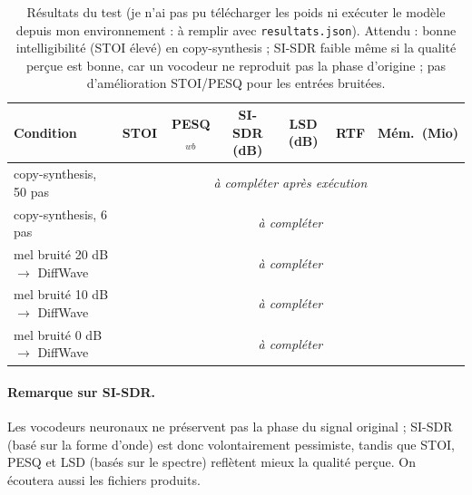 \begin{table}[H]\centering\small
\begin{tabular}{lcccccc}\toprule
Condition & STOI & PESQ$_{wb}$ & SI-SDR (dB) & LSD (dB) & RTF & Mém.\ (Mio)\\\midrule
copy-synthesis, 50 pas & \multicolumn{6}{c}{\emph{à compléter après exécution}}\\
copy-synthesis, 6 pas  & \multicolumn{6}{c}{\emph{à compléter}}\\
mel bruité 20 dB $\to$ DiffWave & \multicolumn{6}{c}{\emph{à compléter}}\\
mel bruité 10 dB $\to$ DiffWave & \multicolumn{6}{c}{\emph{à compléter}}\\
mel bruité 0 dB $\to$ DiffWave & \multicolumn{6}{c}{\emph{à compléter}}\\\bottomrule
\end{tabular}
\caption{Résultats du test (je n'ai pas pu télécharger les poids ni exécuter le modèle depuis mon environnement : à remplir avec \texttt{resultats.json}). Attendu : bonne intelligibilité (STOI élevé) en copy-synthesis ; SI-SDR faible même si la qualité perçue est bonne, car un vocodeur ne reproduit pas la phase d'origine ; pas d'amélioration STOI/PESQ pour les entrées bruitées.}
\end{table}

\paragraph{Remarque sur SI-SDR.} Les vocodeurs neuronaux ne préservent pas la phase du signal original ; SI-SDR (basé sur la forme d'onde) est donc volontairement pessimiste, tandis que STOI, PESQ et LSD (basés sur le spectre) reflètent mieux la qualité perçue. On écoutera aussi les fichiers produits.
